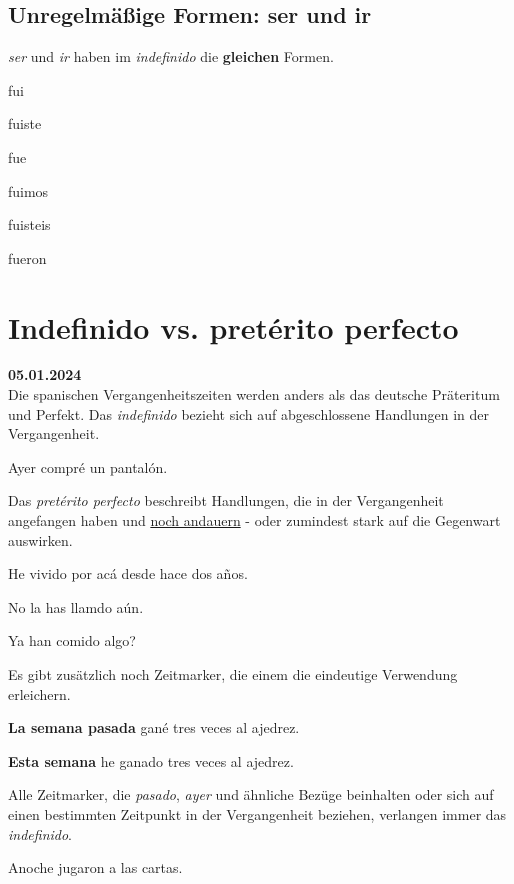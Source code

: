 \subsection*{Unregelmäßige Formen: ser und ir}
 \textit{ser} und \textit{ir} haben im \textit{indefinido} die 
 \textbf{gleichen} Formen.
 \begin{gramatica}
    \item fui
    \item fuiste
    \item fue
    \item fuimos
    \item fuisteis
    \item fueron
 \end{gramatica}
\section{Indefinido vs. pret\'erito perfecto}
\textbf{05.01.2024}\\
Die spanischen Vergangenheitszeiten werden anders als das
deutsche Präteritum und Perfekt. Das \textit{indefinido}
bezieht sich auf abgeschlossene Handlungen in der Vergangenheit.
\begin{ejemplos}
    \item Ayer compr\'e un pantal\'on.
\end{ejemplos}
Das \textit{pret\'erito perfecto} beschreibt Handlungen,
die in der Vergangenheit angefangen haben und 
\underline{noch andauern} - oder zumindest stark auf die
Gegenwart auswirken.
\begin{ejemplos}
    \item He vivido por ac\'a desde hace dos a\~nos.
    \item No la has llamdo a\'un.
    \item Ya han comido algo?
\end{ejemplos}
Es gibt zusätzlich noch Zeitmarker, die einem die eindeutige
Verwendung erleichern.
\begin{ejemplos}
    \item \textbf{La semana pasada} gan\'e tres veces al ajedrez.
    \item \textbf{Esta semana} he ganado tres veces al ajedrez.
\end{ejemplos}
Alle Zeitmarker, die \textit{pasado}, \textit{ayer} und ähnliche Bezüge beinhalten
oder sich auf einen bestimmten Zeitpunkt in der Vergangenheit
beziehen, verlangen immer das \textit{indefinido}.
\begin{ejemplos}
    \item Anoche jugaron a las cartas.
\end{ejemplos}
